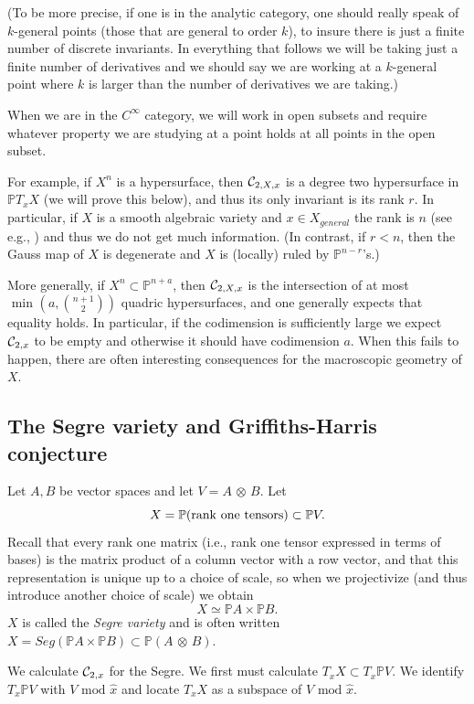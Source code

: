\documentclass[11pt]{amsart}
\theoremstyle{definition}
\theoremstyle{remark}
\numberwithin{equation}{section}
\def\BP{\mathbb P}
\def\pp#1{\mathbb P^{#1}}
\def\pp#1{{\mathbb P}^{#1}}
\def\ot{{\mathord{\,\otimes }\,}}
\def\tmod{\text{ mod }}
\def\tmin{\text{ min }}
\begin{document}
(To be more precise, if one is in the analytic category, one
should really speak of $k$-general points (those that
are general to order $k$), to insure there is
just a finite number of discrete invariants. In everything
that follows we will be taking just a finite number of derivatives
and we should say we are working at a $k$-general point where
$k$ is larger than the number of derivatives we are taking.)


When we are in the $C^{\infty}$ category, we will work in open
subsets and require whatever property we are studying at a point
holds at all points in the open subset.

For example, if $X^n$ is a hypersurface, then  ${\mathcal C}_{2,X,x}$ is
a degree two hypersurface in $\BP T_xX$ (we will prove this below),
and thus its only invariant is its rank $r$. In particular, if $X$
is a smooth algebraic variety and $x\in X_{general}$ the rank is $n$ (see
e.g.,  \cite{GH,
EDSBK}) and thus we do not get much information. (In contrast, if
  $r<n$, then the Gauss map of $X$ is degenerate and $X$ is (locally)
ruled by $\pp{n-r}$'s.)

More generally, if $X^n\subset \pp{n+a}$, then
${\mathcal C}_{2,X,x}$ is
the intersection of at most $\tmin(a,\binom{n+1}2)$ quadric hypersurfaces, and one
generally expects that equality holds. In particular, if the codimension is
sufficiently large we expect ${\mathcal C}_{2,x}$ to be empty and otherwise
it should have codimension $a$. When this fails to happen, there
are often interesting consequences for the macroscopic geometry
of $X$.

\subsection{The Segre variety and Griffiths-Harris conjecture}\label{segex}
Let $A,B$ be vector spaces and let $V=A\ot B$. Let
$$
X=\BP ({\rm rank\ one\ tensors})\subset \BP V.
$$
Recall that every rank one matrix
(i.e., rank one tensor expressed in terms of bases) is the matrix product of
a column vector with a row vector, and that this representation
is unique up to a choice of scale, so when we projectivize
(and thus introduce another choice of scale) we obtain
$$
X\simeq \BP A\times \BP B.
$$
$X$ is called the {\it Segre variety} and is often
written $X=Seg(\BP A\times \BP B)\subset \BP (A\ot B)$.
 

We calculate ${\mathcal C}_{2,x}$ for the Segre. We first
must calculate $T_xX\subset T_x\BP V$. We identify
$T_x\BP V$ with $V\tmod \hat x$ and locate
$T_xX $ as a subspace of $V\tmod \hat x$.
\end{document}
